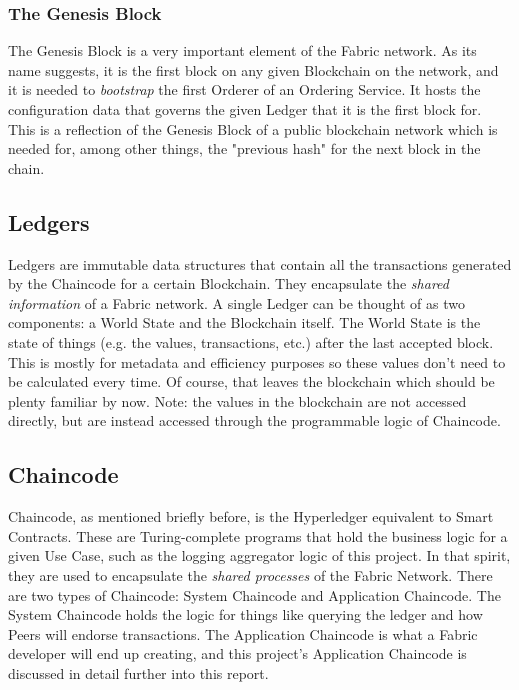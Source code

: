 		\subsubsection{The Genesis Block}
			\hspace{10mm}The Genesis Block is a very important element of the Fabric network. As its name suggests, it is the first block on any given Blockchain on the network, and it is needed to \textit{bootstrap} the first Orderer of an Ordering Service. It hosts the configuration data that governs the given Ledger that it is the first block for. This is a reflection of the Genesis Block of a public blockchain network which is needed for, among other things, the "previous hash" for the next block in the chain.\\
			
	\subsection{Ledgers}
		\hspace{10mm}Ledgers are immutable data structures that contain all the transactions generated by the Chaincode for a certain Blockchain. They encapsulate the \textit{shared information} of a Fabric network. A single Ledger can be thought of as two components: a World State and the Blockchain itself. The World State is the state of things (e.g. the values, transactions, etc.) after the last accepted block. This is mostly for metadata and efficiency purposes so these values don't need to be calculated every time. Of course, that leaves the blockchain which should be plenty familiar by now. Note: the values in the blockchain are not accessed directly, but are instead accessed through the programmable logic of Chaincode.\\
				
	\subsection{Chaincode}
		\hspace{10mm}Chaincode, as mentioned briefly before, is the Hyperledger equivalent to Smart Contracts. These are Turing-complete programs that hold the business logic for a given Use Case, such as the logging aggregator logic of this project. In that spirit, they are used to encapsulate the \textit{shared processes} of the Fabric Network. There are two types of Chaincode: System Chaincode and Application Chaincode. The System Chaincode holds the logic for things like querying the ledger and how Peers will endorse transactions. The Application Chaincode is what a Fabric developer will end up creating, and this project's Application Chaincode is discussed in detail further into this report.\\
